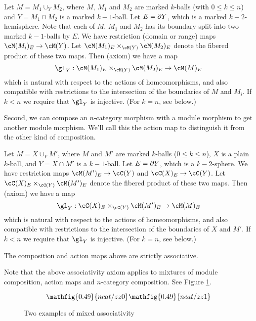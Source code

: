 \begin{module-axiom}
{Let $M = M_1 \cup_Y M_2$, where $M$, $M_1$ and $M_2$ are marked $k$-balls (with $0\le k\le n$)
and $Y = M_1\cap M_2$ is a marked $k{-}1$-ball.
Let $E = \partial Y$, which is a marked $k{-}2$-hemisphere.
Note that each of $M$, $M_1$ and $M_2$ has its boundary split into two marked $k{-}1$-balls by $E$.
We have restriction (domain or range) maps $\cM(M_i)_E \to \cM(Y)$.
Let $\cM(M_1)_E \times_{\cM(Y)} \cM(M_2)_E$ denote the fibered product of these two maps. 
Then (axiom) we have a map
\[
	\gl_Y : \cM(M_1)_E \times_{\cM(Y)} \cM(M_2)_E \to \cM(M)_E
\]
which is natural with respect to the actions of homeomorphisms, and also compatible with restrictions
to the intersection of the boundaries of $M$ and $M_i$.
If $k < n$ we require that $\gl_Y$ is injective.
(For $k=n$, see below.)}
\end{module-axiom}


Second, we can compose an $n$-category morphism with a module morphism to get another
module morphism.
We'll call this the action map to distinguish it from the other kind of composition.

\begin{module-axiom}
{Let $M = X \cup_Y M'$, where $M$ and $M'$ are marked $k$-balls ($0\le k\le n$),
$X$ is a plain $k$-ball,
and $Y = X\cap M'$ is a $k{-}1$-ball.
Let $E = \partial Y$, which is a $k{-}2$-sphere.
We have restriction maps $\cM(M')_E \to \cC(Y)$ and $\cC(X)_E\to \cC(Y)$.
Let $\cC(X)_E \times_{\cC(Y)} \cM(M')_E$ denote the fibered product of these two maps. 
Then (axiom) we have a map
\[
	\gl_Y :\cC(X)_E \times_{\cC(Y)} \cM(M')_E \to \cM(M)_E
\]
which is natural with respect to the actions of homeomorphisms, and also compatible with restrictions
to the intersection of the boundaries of $X$ and $M'$.
If $k < n$ we require that $\gl_Y$ is injective.
(For $k=n$, see below.)}
\end{module-axiom}

\begin{module-axiom}
{The composition and action maps above are strictly associative.}
\end{module-axiom}

Note that the above associativity axiom applies to mixtures of module composition,
action maps and $n$-category composition.
See Figure \ref{zzz1b}.

\begin{figure}[!ht]
\begin{equation*}
\mathfig{0.49}{ncat/zz0} \mathfig{0.49}{ncat/zz1}
\end{equation*}
\caption{Two examples of mixed associativity}
\label{zzz1b}
\end{figure}



